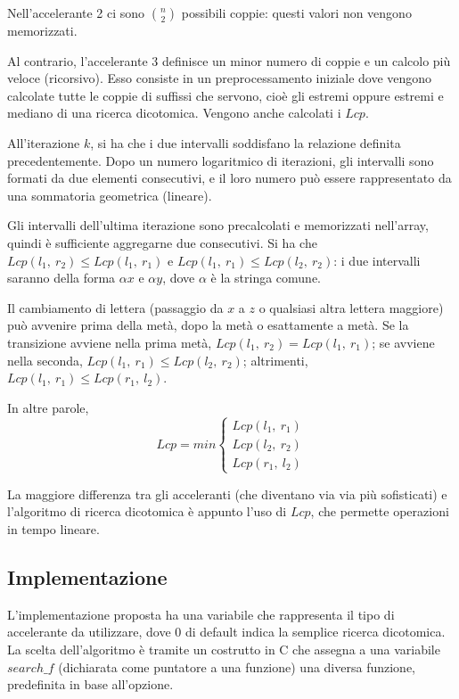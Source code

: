 Nell'accelerante 2 ci sono $n \choose 2$  possibili coppie: questi valori non vengono memorizzati. 

Al contrario, l'accelerante 3 definisce un minor numero di coppie e un calcolo più veloce (ricorsivo). Esso consiste in un preprocessamento iniziale dove vengono calcolate tutte le coppie di suffissi che servono, cioè gli estremi oppure estremi e mediano di una ricerca dicotomica. Vengono anche calcolati i $Lcp$.

All'iterazione $k$, si ha che i due intervalli soddisfano la relazione definita precedentemente. Dopo un numero logaritmico di iterazioni, gli intervalli sono formati da due elementi consecutivi, e il loro numero può essere rappresentato da una sommatoria geometrica (lineare). 

Gli intervalli dell'ultima iterazione sono precalcolati e memorizzati nell'array, quindi è sufficiente aggregarne due consecutivi. Si ha che $Lcp(l_1,\ r_2) \leq Lcp(l_1,\ r_1)$ e $Lcp(l_1,\ r_1) \leq Lcp(l_2,\ r_2)$: i due intervalli saranno della forma $\alpha x$ e $\alpha y$, dove $\alpha$ è la stringa comune. 

Il cambiamento di lettera (passaggio da $x$ a $z$ o qualsiasi altra lettera maggiore) può avvenire prima della metà, dopo la metà o esattamente a metà. Se la transizione avviene nella prima metà, $Lcp(l_1,\ r_2) = Lcp(l_1,\ r_1)$; se avviene nella seconda, $Lcp(l_1,\ r_1) \leq Lcp(l_2,\ r_2)$; altrimenti, $Lcp(l_1,\ r_1) \leq Lcp(r_1,\ l_2)$.

In altre parole,
$$Lcp = min\begin{cases}
Lcp(l_1,\ r_1) \\
Lcp(l_2,\ r_2) \\
Lcp(r_1,\ l_2)
\end{cases}$$

La maggiore differenza tra gli acceleranti (che diventano via via più sofisticati) e l'algoritmo di ricerca dicotomica è appunto l'uso di $Lcp$, che permette operazioni in tempo lineare.

\subsection{Implementazione}
L'implementazione proposta ha una variabile che rappresenta il tipo di accelerante da utilizzare, dove 0 di default indica la semplice ricerca dicotomica. \\
La scelta dell'algoritmo è tramite un costrutto in C che assegna a una variabile $search\_f$ (dichiarata come puntatore a una funzione) una diversa funzione, predefinita in base all'opzione. 

